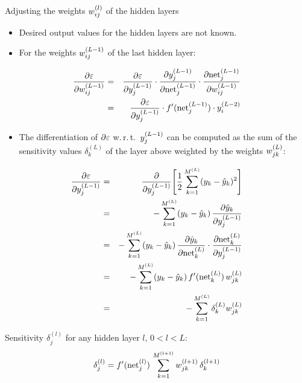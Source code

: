 Adjusting the weights $w_{ij}^{(l)}$ of the hidden layers
  \begin{itemize}
    \item Desired output values for the hidden layers are not known.
    \item For the weights $w_{ij}^{(L-1)}$ of the last hidden layer:
  \end{itemize}
      \footnotesize
      \begin{eqnarray*}
        \frac{\partial \varepsilon}{\partial w_{ij}^{(L-1)}} & = &
        \frac{\partial \varepsilon}{\partial y_{j}^{(L-1)}} \cdot
        \frac{\partial y_{j}^{(L-1)}}{\partial \text{net}_{j}^{(L-1)}} \cdot
        \frac{\partial \text{net}_{j}^{(L-1)}}{\partial w_{ij}^{(L-1)}} \\
        & = & \frac{\partial \varepsilon}{\partial y_{j}^{(L-1)}} \cdot
        f'(\text{net}_{j}^{(L-1)}) \cdot y_{i}^{(L-2)}
      \end{eqnarray*}

   \begin{itemize}
     \item {\small The differentiation of $\partial \varepsilon$ w.\,r.\,t.\ $y_{j}^{(L-1)}$ can be computed as the sum of the sensitivity values $\delta_k^{(L)}$ of the layer above weighted by the weights $w_{jk}^{(L)}$:}
   \end{itemize}
   \footnotesize
      \begin{eqnarray*}
        \frac{\partial \varepsilon}{\partial y_{j}^{(L-1)}} & = &
        \frac{\partial}{\partial y_{j}^{(L-1)}} \Bigg[
          \frac{1}{2} \sum_{k=1}^{M^{(L)}} (y_k - \hat y_k)^2  \Bigg] \\ 
        & = & - \sum_{k=1}^{M^{(L)}} (y_k - \hat y_k) \, \frac{\partial\hat y_k}{\partial y_{j}^{(L-1)}} \\
        & = & - \sum_{k=1}^{M^{(L)}} (y_k - \hat y_k) \, \frac{\partial\hat y_k}{\partial\text{net}_{k}^{(L)}} \cdot    \frac{\partial\text{net}_{k}^{(L)}}{\partial y_{j}^{(L-1)}} \nonumber \\
        & = & - \sum_{k=1}^{M^{(L)}} (y_k - \hat y_k) \, f'(\text{net}_{k}^{(L)}) \, w_{jk}^{(L)} \\
        & = & - \sum_{k=1}^{M^{(L)}} \delta_k^{(L)} w_{jk}^{(L)}
      \end{eqnarray*}

  Sensitivity $\delta_j^{(l)}$ for any hidden layer $l$, $0<l<L$:
  \begin{displaymath}
    \delta_j^{(l)} = f'(\text{net}_{j}^{(l)}) \, \sum_{k=1}^{M^{(l+1)}} w_{jk}^{(l+1)} \, \delta_k^{(l+1)}
  \end{displaymath}

